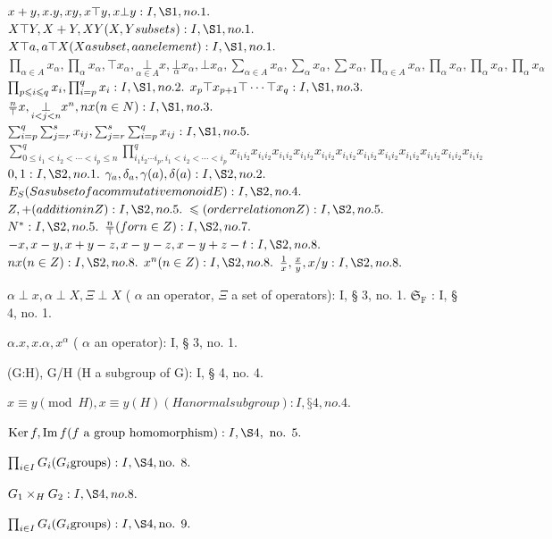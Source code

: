 \(x + y, x.y, xy, x \top y, x \bot y: I, \S 1, no. 1.\) \(X \top Y, X + Y, XY (X, Y subsets): I, \S 1, no. 1.\) \(X \top a, a \top X (X a subset, a an element): I, \S 1, no. 1.\) \(\prod_{\alpha \in A} x_{\alpha}, \prod_{\alpha} x_{\alpha}, \top x_{\alpha}, \underset{\alpha \in A}{\bot} x, \underset{\alpha}{\bot} x_{\alpha}, \bot x_{\alpha}, \sum_{\alpha \in A} x_{\alpha}, \sum_{\alpha} x_{\alpha}, \sum x_{\alpha}, \prod_{\alpha \in A} x_{\alpha}, \prod_{\alpha} x_{\alpha}, \prod_{\alpha} x_{\alpha}, \prod_{\alpha} x_{\alpha}\) \(\prod_{p \leqslant i \leqslant q} x_i, \prod_{i=p}^q x_i: I, \S 1, no. 2.\) \(x_p \top x_{p+1} \top \cdots \top x_q: I, \S 1, no. 3.\) \(\frac{n}{\top} x, \underset{i < j < n}{\bot} x^n, nx (n \in N): I, \S 1, no. 3.\) \(\sum_{i=p}^{q} \sum_{j=r}^{s} x_{ij}, \sum_{j=r}^{s} \sum_{i=p}^{q} x_{ij}: I, \S 1, no. 5.\) \(\sum_{0 \leqslant i_1 < i_2 < \cdots < i_p \leqslant n} ^{q} \prod_{i_1 i_2 \cdots i_p, i_1 < i_2 < \cdots < i_p} ^{q} x_{i_1 i_2} x_{i_1 i_2} x_{i_1 i_2} x_{i_1 i_2} x_{i_1 i_2} x_{i_1 i_2} x_{i_1 i_2} x_{i_1 i_2} x_{i_1 i_2} x_{i_1 i_2} x_{i_1 i_2} x_{i_1 i_2}\) \(0, 1: I, \S 2, no. 1.\) \(\gamma_a, \delta_a, \gamma(a), \delta(a): I, \S 2, no. 2.\) \(E_S (S a subset of a commutative monoid E): I, \S 2, no. 4.\) \(Z, +(addition in Z): I, \S 2, no. 5.\) \(\leqslant (order relation on Z): I, \S 2, no. 5.\) \(N^*: I, \S 2, no. 5.\) \(\frac{n}{\top} (for n \in Z): I, \S 2, no. 7.\) \(-x, x - y, x + y - z, x - y - z, x - y + z - t: I, \S 2, no. 8.\) \(nx (n \in Z): I, \S 2, no. 8.\) \(x^n (n \in Z): I, \S 2, no. 8.\) \(\frac{1}{x}, \frac{x}{y}, x/y: I, \S 2, no. 8.\)

\(\alpha \perp x, \alpha \perp X, \Xi \perp X\) ( \(\alpha\) an operator, \(\Xi\) a set of operators): I, § 3, no. 1. \(\mathfrak{S}_{\mathrm{F}}\) : I, § 4, no. 1.

\(\alpha .x,x.\alpha ,x^{\alpha}\) ( \(\alpha\) an operator): I, § 3, no. 1.

(G:H), G/H (H a subgroup of G): I, § 4, no. 4.

\(x \equiv y \pmod{H}, x \equiv y (H) (H a normal subgroup): I, § 4, no. 4.\)

\(\operatorname{Ker} f, \operatorname{Im} f (f \text{ a group homomorphism}) : I, \S 4, \text{ no. } 5.\)

\(\prod_{i \in I} G_i (G_i \text{groups}) : I, \S 4, \text{no. } 8.\)

\(G_{1} \times_{H} G_{2}: I, \S 4, no. 8.\)

\(\prod_{i \in I} G_i (G_i \text{groups}) : I, \S 4, \text{no. } 9.\)

